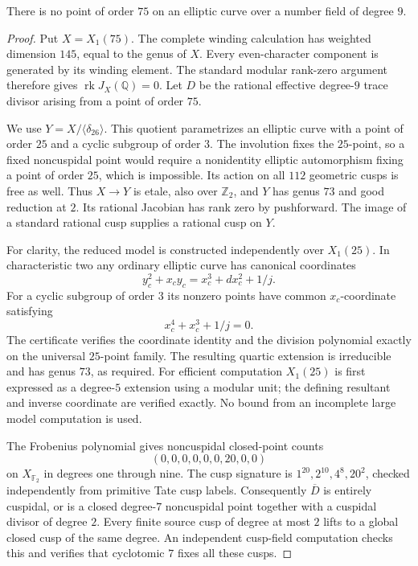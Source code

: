 \begin{proposition}\label{prop:nonic-C75}
There is no point of order $75$ on an elliptic curve over a number field of degree $9$.
\end{proposition}
\begin{proof}
Put $X=X_1(75)$. The complete winding calculation has weighted
dimension $145$, equal to the genus of $X$. Every even-character
component is generated by its winding element. The standard modular
rank-zero argument therefore gives $\operatorname{rk}J_X(\mathbb Q)=0$.
Let $D$ be the rational effective degree-$9$ trace divisor arising
from a point of order $75$.

We use $Y=X/\langle\delta_{26}\rangle$. This quotient parametrizes
an elliptic curve with a point of order $25$ and a cyclic subgroup
of order $3$. The involution fixes the $25$-point, so a fixed
noncuspidal point would require a nonidentity elliptic automorphism
fixing a point of order $25$, which is impossible. Its action on
all $112$ geometric cusps is free as well. Thus $X\to Y$ is etale,
also over $\mathbb Z_2$, and $Y$ has genus $73$ and good reduction
at $2$. Its rational Jacobian has rank zero by pushforward.
The image of a standard rational cusp supplies a rational cusp on $Y$.

For clarity, the reduced model is constructed independently over
$X_1(25)$. In characteristic two any ordinary elliptic curve has
canonical coordinates
\[
 y_c^2+x_cy_c=x_c^3+d x_c^2+1/j.
\]
For a cyclic subgroup of order $3$ its nonzero points have common
$x_c$-coordinate satisfying
\[
 x_c^4+x_c^3+1/j=0.                                   \tag{1}
\]
The certificate verifies the coordinate identity and the division
polynomial exactly on the universal $25$-point family. The resulting
quartic extension is irreducible and has genus $73$, as required.
For efficient computation $X_1(25)$ is first expressed as a degree-$5$
extension using a modular unit; the defining resultant and inverse
coordinate are verified exactly. No bound from an incomplete large
model computation is used.

The Frobenius polynomial gives noncuspidal closed-point counts
\[
 (0,0,0,0,0,0,20,0,0)
\]
on $X_{\mathbb F_2}$ in degrees one through nine. The cusp signature
is $1^{20},2^{10},4^8,20^2$, checked independently from primitive
Tate cusp labels. Consequently $\overline D$ is entirely cuspidal,
or is a closed degree-$7$ noncuspidal point together with a cuspidal divisor of degree $2$. Every finite source cusp of degree at most $2$ lifts to a global
closed cusp of the same degree. An independent cusp-field computation
checks this and verifies that cyclotomic $7$ fixes all these cusps.


\end{proof}
